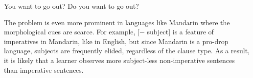 \bxl
You want to go out?
\ex Do you want to go out?
\exl
\eex

The problem is even more prominent in languages like Mandarin where the morphological cues are scarce. For example, [$-$ subject] is a feature of imperatives in Mandarin, like in English, but since Mandarin is a pro-drop language, subjects are frequently elided, regardless of the clause type. As a result, it is likely that a learner observes more subject-less non-imperative sentences than imperative sentences.  



